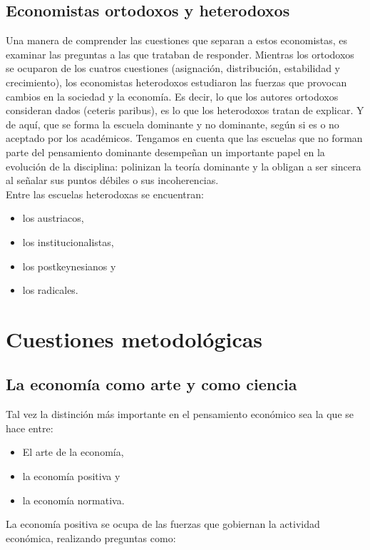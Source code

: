 \documentclass[10pt]{book}
\begin{document}
\subsection{Economistas ortodoxos y heterodoxos}
Una manera de comprender las cuestiones que separan a estos economistas, es examinar las preguntas a las que trataban de responder. Mientras los ortodoxos se ocuparon de los cuatros cuestiones (asignación, distribución, estabilidad y crecimiento), los economistas heterodoxos estudiaron las fuerzas que provocan cambios en la sociedad y la economía. Es decir, lo que los autores ortodoxos consideran dados (ceteris paribus), es lo que los heterodoxos tratan de explicar. Y de aquí, que se forma la escuela dominante y no dominante, según si es o no aceptado por los académicos. Tengamos en cuenta que las escuelas que no forman parte del pensamiento dominante desempeñan un importante papel en la evolución de la disciplina: polinizan la teoría dominante y la obligan a ser sincera al señalar sus puntos débiles o sus incoherencias.\\

Entre las escuelas heterodoxas se encuentran:

\begin{itemize}
    \item los austriacos,
    \item los institucionalistas,
    \item los postkeynesianos y 
    \item los radicales.
\end{itemize}

\section{Cuestiones metodológicas}
\subsection{La economía como arte y como ciencia}
Tal vez la distinción más importante en el pensamiento económico sea la que se hace entre:

\begin{itemize}
    \item El arte de la economía, 
    \item la economía positiva y 
    \item la economía normativa.
\end{itemize}

La economía positiva se ocupa de las fuerzas que gobiernan la actividad económica, realizando preguntas como:
\end{document}
